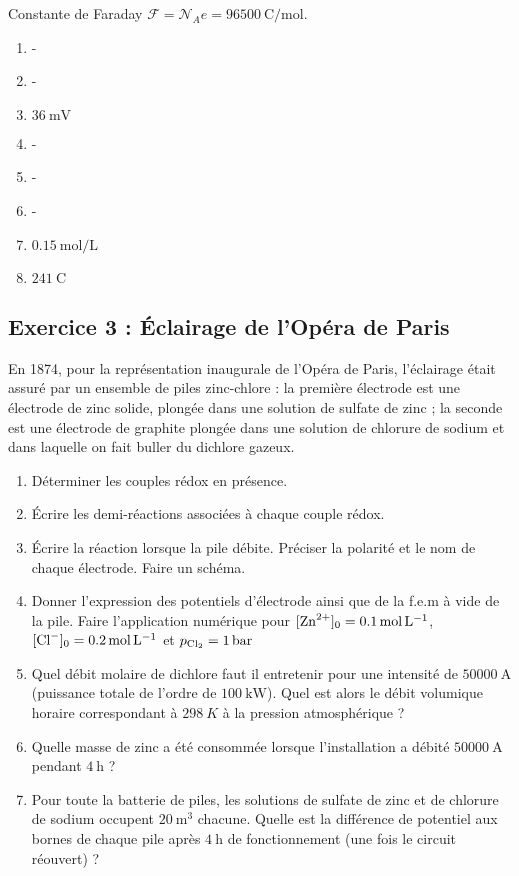  Constante de Faraday $\mathcal{F} = \mathcal{N}_A e = \SI{96500}{\coulomb\per\mole}$.

\begin{enumerate}
	\item -
	\item -
	\item $\SI{36}{\milli\volt}$
	\item -
	\item -
	\item -
	\item $\SI{0.15}{\mol\per\liter}$
	\item $\SI{241}{\coulomb}$
\end{enumerate}

\subsection{Exercice 3 : Éclairage de l'Opéra de Paris}

En 1874, pour la représentation inaugurale de l'Opéra de Paris, l'éclairage était assuré par un ensemble de piles zinc-chlore : la première électrode est une électrode de zinc solide, plongée dans une solution de sulfate de zinc ; la seconde est une électrode de graphite plongée dans une solution de chlorure de sodium et dans laquelle on fait buller du dichlore gazeux. 

\begin{enumerate}
	\item Déterminer les couples rédox en présence.
	\item Écrire les demi-réactions associées à chaque couple rédox.
	\item Écrire la réaction lorsque la pile débite. Préciser la polarité et le nom de chaque électrode. Faire un schéma.
	\item Donner l'expression des potentiels d'électrode ainsi que de la f.e.m à vide de la pile. Faire l'application numérique pour $[\ce{Zn^2+}]_0 = \SI{0.1}{\mole\per\liter}$, $[\ce{Cl-}]_0 = \SI{0.2}{\mole\per\liter}$ et $p_{\ce{Cl2}} = \SI{1}{bar}$
	\item Quel débit molaire de dichlore faut il entretenir pour une intensité de $\SI{50000}{\ampere}$ (puissance totale de l'ordre de $\SI{100}{\kilo\watt}$). Quel est alors le débit volumique horaire correspondant à $\SI{298}{K}$ à la pression atmosphérique ?
	\item Quelle masse de zinc a été consommée lorsque l'installation a débité $\SI{50000}{\ampere}$ pendant $\SI{4}{\hour}$ ?
	\item Pour toute la batterie de piles, les solutions de sulfate de zinc et de chlorure de sodium occupent $\SI{20}{\meter\cubed}$ chacune. Quelle est la différence de potentiel aux bornes de chaque pile après $\SI{4}{\hour}$ de fonctionnement (une fois le circuit réouvert) ?
\end{enumerate}

